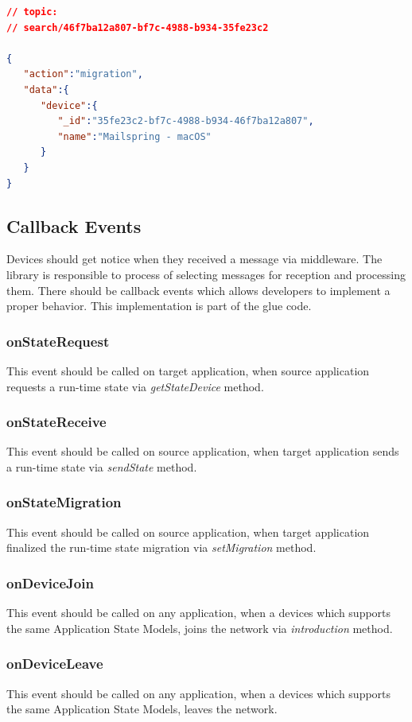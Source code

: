 \lstset{
  label=lis:api-setmigration,caption=K-9 Mail sends run-time state of search to Mailspring.
}
\begin{lstlisting}[language=json]
// topic:
// search/46f7ba12a807-bf7c-4988-b934-35fe23c2

{
   "action":"migration",
   "data":{
      "device":{
         "_id":"35fe23c2-bf7c-4988-b934-46f7ba12a807",
         "name":"Mailspring - macOS"
      }
   }
}
\end{lstlisting}

\subsection{Callback Events}
Devices should get notice when they received a message via middleware. The library is responsible to process of selecting messages for reception and processing them. There should be callback events which allows developers to implement a proper behavior. This implementation is part of the glue code.

\subsubsection{onStateRequest}
This event should be called on target application, when source application requests a run-time state via \textit{getStateDevice} method.

\subsubsection{onStateReceive}
This event should be called on source application, when target application sends a run-time state via \textit{sendState} method.

\subsubsection{onStateMigration}
This event should be called on source application, when target application  finalized the run-time state migration via \textit{setMigration} method.

\subsubsection{onDeviceJoin}
This event should be called on any application, when a devices which supports the same Application State Models, joins the network via \textit{introduction} method.

\subsubsection{onDeviceLeave}
This event should be called on any application, when a devices which supports the same Application State Models, leaves the network.


